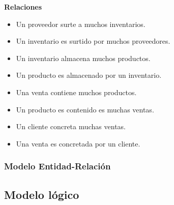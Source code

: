 \documentclass[12pt,letterpaper]{article}
\begin{document}
			\textbf{Relaciones}\par
			\begin{itemize}
				\item Un proveedor surte a muchos inventarios.
				\item Un inventario es surtido por muchos proveedores. \\
				\item Un inventario almacena muchos productos.
				\item Un producto es almacenado por un inventario.\\
				\item Una venta contiene muchos productos.
				\item Un producto es contenido es muchas ventas.\\
				\item Un cliente concreta muchas ventas.
				\item Una venta es concretada por un cliente.
				
			\end{itemize}
			\subsubsection{Modelo Entidad-Relación}
			
		\subsection{Modelo lógico}
\end{document}
